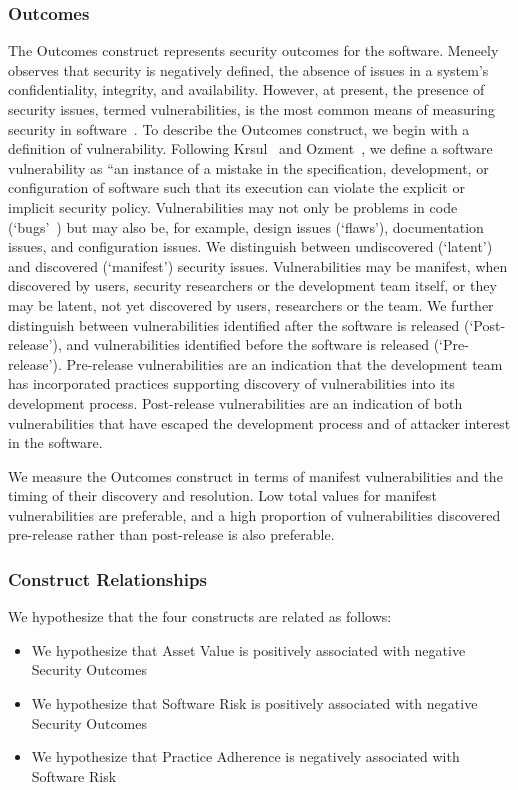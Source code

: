 \subsubsection{Outcomes}
\label{sec:model_contruct_outcome}
The Outcomes construct represents security outcomes for the software. Meneely~\cite{meneely2016security} observes that security is negatively defined, the absence of issues in a system's confidentiality, integrity, and availability. 
However, at present, the presence of security issues, termed vulnerabilities, is the most common means of measuring security in software~\cite{morrison2014mapping}.
To describe the Outcomes construct, we begin with a definition of vulnerability. Following Krsul~\cite{krsul1998software} and Ozment~\cite{ozment2007vulnerability}, we define a software vulnerability as “an instance of a mistake in the specification, development, or configuration of software such that its execution can violate the explicit or implicit security policy.  Vulnerabilities may not only be problems in code (`bugs'~\cite{mcgraw2006software}) but may also be, for example, design issues (`flaws'), documentation issues, and configuration issues.  We distinguish between undiscovered (`latent') and discovered (`manifest') security issues.  Vulnerabilities may be manifest, when discovered by users, security researchers or the development team itself, or they may be latent, not yet discovered by users, researchers or the team. We further distinguish between vulnerabilities identified after the software is released (`Post-release'), and vulnerabilities identified before the software is released (`Pre-release'). Pre-release vulnerabilities are an indication that the development team has incorporated practices supporting discovery of vulnerabilities into its development process. Post-release vulnerabilities are an indication of both vulnerabilities that have escaped the development process and of attacker interest in the software. 

We measure the Outcomes construct in terms of manifest vulnerabilities and the timing of their discovery and resolution. Low total values for manifest vulnerabilities are preferable, and a high proportion of vulnerabilities discovered pre-release rather than post-release is also preferable. 

\subsubsection{Construct Relationships}
We hypothesize that the four constructs are related as follows:
\begin{itemize}
	\item We hypothesize that Asset Value is positively associated with negative Security Outcomes
	\item We hypothesize that Software Risk is positively associated with negative Security Outcomes
	\item We hypothesize that Practice Adherence is negatively associated with Software Risk 	
\end{itemize}

